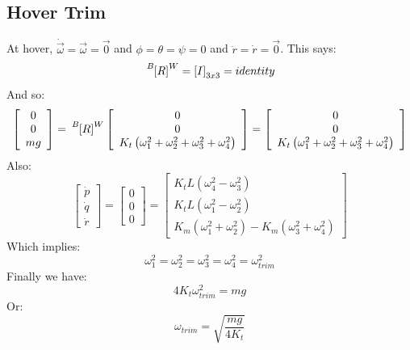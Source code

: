 \documentclass{article}
\numberwithin{equation}{section}
\newcommand{\BtoW}{
\tensor[^B]{\left[R\right]}{^W}
}
\begin{document}
\subsection{Hover Trim}
  At hover, $\dot{\vec{\omega}} = \vec{\omega} = \vec{0}$ and $\phi = \theta = \psi = 0$ and $\ddot{r}     = \dot{r} = \vec{0}$.  This says:
  \[\BtoW = \left[I\right]_{3x3} = identity\]
  And so: 
  \begin{equation}
   \left[ \begin{array}{ccc}
            0 \\
            0 \\
            mg \end{array} \right]
            =
      \BtoW \left[\begin{array}{ccc}
           0 \\
           0 \\
           K_t\left(\omega_1^2 + \omega_2^2 + \omega_3^2 + \omega_4^2\right)
           \end{array}\right]
           =
           \left[\begin{array}{ccc}
           0 \\
           0 \\
           K_t\left(\omega_1^2 + \omega_2^2 + \omega_3^2 + \omega_4^2\right)
           \end{array}\right]
 \end{equation}
  Also:
  \begin{equation}
      \left[ \begin{array}{ccc} \dot{p} \\ 
    							\dot{q} \\ 
  							\dot{r} \end{array} \right]
  				        =
      \left[ \begin{array}{ccc} 0 \\ 
    				        0 \\ 
  				        0 \end{array} \right]
  				        =
   \left[ \begin{array}{ccc} K_{t}L\left(\omega_4^2 - \omega_3^2\right) \\ 
    				      K_{t}L\left(\omega_1^2 - \omega_2^2\right) \\ 
  				      K_{m}\left(\omega_1^2 + \omega_2^2\right) - K_{m}\left(\omega_3^2 +  \omega_4^2\right) \end{array} \right]
  \end{equation}
  Which implies:
  \[\omega_1^2 = \omega_2^2 = \omega_3^2 = \omega_4^2 = \omega_{trim}^2\]
  Finally we have:
  \[4K_t\omega_{trim}^2 = mg\]
  Or:
  \begin{equation}
  \label{trimOmega} 
  \omega_{trim} = \sqrt{\frac{mg}{4K_t}}
  \end{equation}
\end{document}
